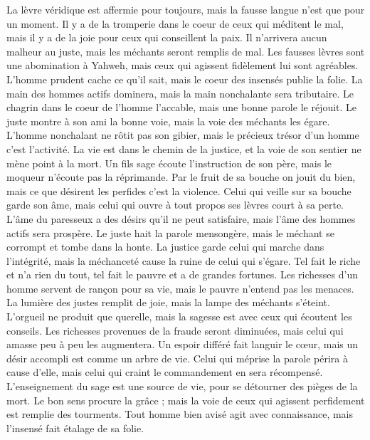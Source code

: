 \begin{multicols}{2}
La lèvre véridique est affermie pour toujours, mais la fausse langue n'est que pour un moment.
Il y a de la tromperie dans le coeur de ceux qui méditent le mal, mais il y a de la joie pour ceux qui conseillent la paix.
Il n’arrivera aucun malheur au juste, mais les méchants seront remplis de mal.
Les fausses lèvres sont une abomination à Yahweh, mais ceux qui agissent fidèlement lui sont agréables.
L'homme prudent cache ce qu’il sait, mais le coeur des insensés publie la folie.
La main des hommes actifs dominera, mais la main nonchalante sera tributaire.
Le chagrin dans le coeur de l'homme l'accable, mais une bonne parole le réjouit.
Le juste montre à son ami la bonne voie, mais la voie des méchants les égare.
L’homme nonchalant ne rôtit pas son gibier, mais le précieux trésor d'un homme c’est l’activité.
La vie est dans le chemin de la justice, et la voie de son sentier ne mène point à la mort.
\VerseOne{}Un fils sage écoute l'instruction de son père, mais le moqueur n'écoute pas la réprimande.
Par le fruit de sa bouche on jouit du bien, mais ce que désirent les perfides c’est la violence.
Celui qui veille sur sa bouche garde son âme, mais celui qui ouvre à tout propos ses lèvres court à sa perte.
L'âme du paresseux a des désirs qu’il ne peut satisfaire, mais l'âme des hommes actifs sera prospère.
Le juste hait la parole mensongère, mais le méchant se corrompt et tombe dans la honte.
La justice garde celui qui marche dans l’intégrité, mais la méchanceté cause la ruine de celui qui s'égare.
Tel fait le riche et n'a rien du tout, tel fait le pauvre et a de grandes fortunes.
Les richesses d'un homme servent de rançon pour sa vie, mais le pauvre n’entend pas les menaces.
La lumière des justes remplit de joie, mais la lampe des méchants s’éteint.
L'orgueil ne produit que querelle, mais la sagesse est avec ceux qui écoutent les conseils.
Les richesses provenues de la fraude seront diminuées, mais celui qui amasse peu à peu les augmentera.
Un espoir différé fait languir le cœur, mais un désir accompli est comme un arbre de vie.
Celui qui méprise la parole périra à cause d'elle, mais celui qui craint le commandement en sera récompensé.
L'enseignement du sage est une source de vie, pour se détourner des pièges de la mort.
Le bon sens procure la grâce ; mais la voie de ceux qui agissent perfidement est remplie des tourments.
Tout homme bien avisé agit avec connaissance, mais l’insensé fait étalage de sa folie.

\end{multicols}
